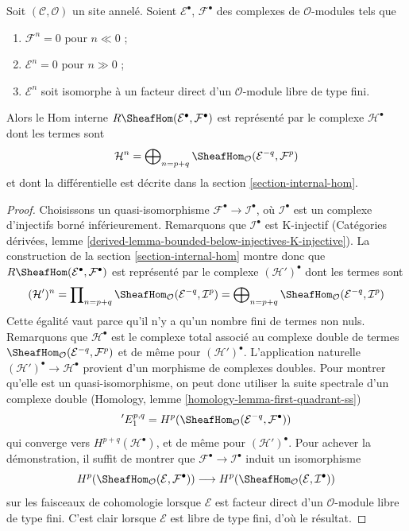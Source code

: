 \begin{lemma}
\label{lemma-Rhom-complex-of-direct-summands-finite-free}
Soit $(\mathcal{C}, \mathcal{O})$ un site annelé. Soient
$\mathcal{E}^\bullet$, $\mathcal{F}^\bullet$ des complexes de
$\mathcal{O}$-modules tels que
\begin{enumerate}
\item $\mathcal{F}^n = 0$ pour $n \ll 0$ ;
\item $\mathcal{E}^n = 0$ pour $n \gg 0$ ;
\item $\mathcal{E}^n$ soit isomorphe à un facteur direct d'un
$\mathcal{O}$-module libre de type fini.
\end{enumerate}
Alors le Hom interne
$R\SheafHom(\mathcal{E}^\bullet, \mathcal{F}^\bullet)$ est représenté par le
complexe $\mathcal{H}^\bullet$ dont les termes sont
$$
\mathcal{H}^n =
\bigoplus\nolimits_{n = p + q}
\SheafHom_\mathcal{O}(\mathcal{E}^{-q}, \mathcal{F}^p)
$$
et dont la différentielle est décrite dans la section
\ref{section-internal-hom}.
\end{lemma}

\begin{proof}
Choisissons un quasi-isomorphisme
$\mathcal{F}^\bullet \to \mathcal{I}^\bullet$, où $\mathcal{I}^\bullet$ est un
complexe d'injectifs borné inférieurement. Remarquons que
$\mathcal{I}^\bullet$ est K-injectif (Catégories dérivées, lemme
\ref{derived-lemma-bounded-below-injectives-K-injective}). La construction de
la section \ref{section-internal-hom} montre donc que
$R\SheafHom(\mathcal{E}^\bullet, \mathcal{F}^\bullet)$ est représenté par le
complexe $(\mathcal{H}')^\bullet$ dont les termes sont
$$
(\mathcal{H}')^n =
\prod\nolimits_{n = p + q}
\SheafHom_\mathcal{O}(\mathcal{E}^{-q}, \mathcal{I}^p) =
\bigoplus\nolimits_{n = p + q}
\SheafHom_\mathcal{O}(\mathcal{E}^{-q}, \mathcal{I}^p)
$$
Cette égalité vaut parce qu'il n'y a qu'un nombre fini de termes non nuls.
Remarquons que $\mathcal{H}^\bullet$ est le complexe total associé au complexe
double de termes
$\SheafHom_\mathcal{O}(\mathcal{E}^{-q}, \mathcal{F}^p)$
et de même pour $(\mathcal{H}')^\bullet$. L'application naturelle
$(\mathcal{H}')^\bullet \to \mathcal{H}^\bullet$ provient d'un morphisme de
complexes doubles. Pour montrer qu'elle est un quasi-isomorphisme, on peut
donc utiliser la suite spectrale d'un complexe double (Homology, lemme
\ref{homology-lemma-first-quadrant-ss})
$$
{}'E_1^{p, q} =
H^p(\SheafHom_\mathcal{O}(\mathcal{E}^{-q}, \mathcal{F}^\bullet))
$$
qui converge vers $H^{p + q}(\mathcal{H}^\bullet)$, et de même pour
$(\mathcal{H}')^\bullet$. Pour achever la démonstration, il suffit de montrer
que $\mathcal{F}^\bullet \to \mathcal{I}^\bullet$ induit un isomorphisme
$$
H^p(\SheafHom_\mathcal{O}(\mathcal{E}, \mathcal{F}^\bullet))
\longrightarrow
H^p(\SheafHom_\mathcal{O}(\mathcal{E}, \mathcal{I}^\bullet))
$$
sur les faisceaux de cohomologie lorsque $\mathcal{E}$ est facteur direct
d'un $\mathcal{O}$-module libre de type fini. C'est clair lorsque
$\mathcal{E}$ est libre de type fini, d'où le résultat.
\end{proof}









